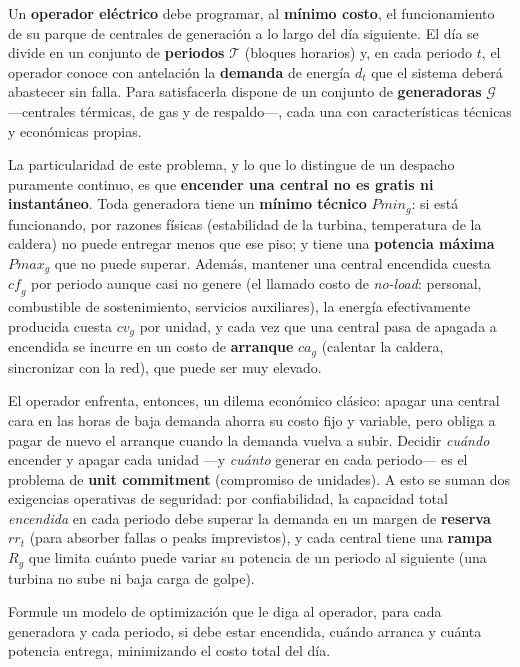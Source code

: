 \documentclass[11pt]{article}
\begin{document}
Un \textbf{operador eléctrico} debe programar, al \textbf{mínimo costo}, el funcionamiento de su parque de centrales de generación a lo largo del día siguiente. El día se divide en un conjunto de \textbf{periodos} $\mathcal{T}$ (bloques horarios) y, en cada periodo $t$, el operador conoce con antelación la \textbf{demanda} de energía $d_t$ que el sistema deberá abastecer sin falla. Para satisfacerla dispone de un conjunto de \textbf{generadoras} $\mathcal{G}$ —centrales térmicas, de gas y de respaldo—, cada una con características técnicas y económicas propias.

La particularidad de este problema, y lo que lo distingue de un despacho puramente continuo, es que \textbf{encender una central no es gratis ni instantáneo}. Toda generadora tiene un \textbf{mínimo técnico} $\mathit{Pmin}_g$: si está funcionando, por razones físicas (estabilidad de la turbina, temperatura de la caldera) no puede entregar menos que ese piso; y tiene una \textbf{potencia máxima} $\mathit{Pmax}_g$ que no puede superar. Además, mantener una central encendida cuesta $\mathit{cf}_g$ por periodo aunque casi no genere (el llamado costo de \emph{no-load}: personal, combustible de sostenimiento, servicios auxiliares), la energía efectivamente producida cuesta $\mathit{cv}_g$ por unidad, y cada vez que una central pasa de apagada a encendida se incurre en un costo de \textbf{arranque} $\mathit{ca}_g$ (calentar la caldera, sincronizar con la red), que puede ser muy elevado.

El operador enfrenta, entonces, un dilema económico clásico: apagar una central cara en las horas de baja demanda ahorra su costo fijo y variable, pero obliga a pagar de nuevo el arranque cuando la demanda vuelva a subir. Decidir \emph{cuándo} encender y apagar cada unidad —y \emph{cuánto} generar en cada periodo— es el problema de \textbf{unit commitment} (compromiso de unidades). A esto se suman dos exigencias operativas de seguridad: por confiabilidad, la capacidad total \emph{encendida} en cada periodo debe superar la demanda en un margen de \textbf{reserva} $\mathit{rr}_t$ (para absorber fallas o peaks imprevistos), y cada central tiene una \textbf{rampa} $R_g$ que limita cuánto puede variar su potencia de un periodo al siguiente (una turbina no sube ni baja carga de golpe).

Formule un modelo de optimización que le diga al operador, para cada generadora y cada periodo, si debe estar encendida, cuándo arranca y cuánta potencia entrega, minimizando el costo total del día.
\end{document}
